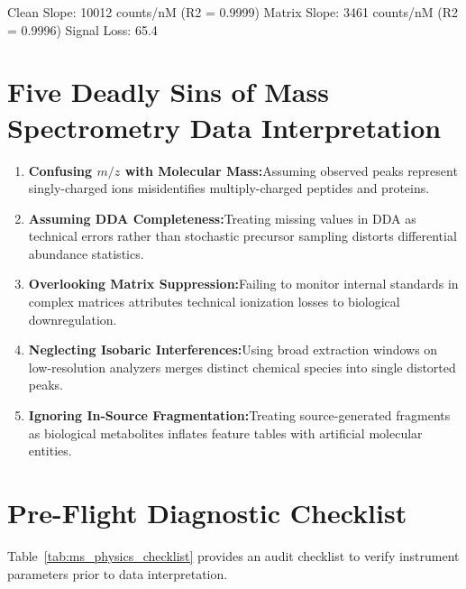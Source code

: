 \documentclass[11pt,twoside,openright]{book}
\begin{document}
\begin{routput}
Clean Slope:  10012 counts/nM (R2 = 0.9999)
Matrix Slope: 3461 counts/nM (R2 = 0.9996)
Signal Loss:  65.4%
\end{routput}

\section{Five Deadly Sins of Mass Spectrometry Data Interpretation}
\label{sec:deadly_sins}

\begin{enumerate}
    \item \textbf{Confusing $m/z$ with Molecular Mass:}\enspace Assuming observed peaks represent singly-charged ions misidentifies multiply-charged peptides and proteins.
    \item \textbf{Assuming DDA Completeness:}\enspace Treating missing values in DDA as technical errors rather than stochastic precursor sampling distorts differential abundance statistics.
    \item \textbf{Overlooking Matrix Suppression:}\enspace Failing to monitor internal standards in complex matrices attributes technical ionization losses to biological downregulation.
    \item \textbf{Neglecting Isobaric Interferences:}\enspace Using broad extraction windows on low-resolution analyzers merges distinct chemical species into single distorted peaks.
    \item \textbf{Ignoring In-Source Fragmentation:}\enspace Treating source-generated fragments as biological metabolites inflates feature tables with artificial molecular entities.
\end{enumerate}

\section{Pre-Flight Diagnostic Checklist}
\label{sec:diagnostic_checklist}

Table~\ref{tab:ms_physics_checklist} provides an audit checklist to verify instrument parameters prior to data interpretation.
\end{document}
